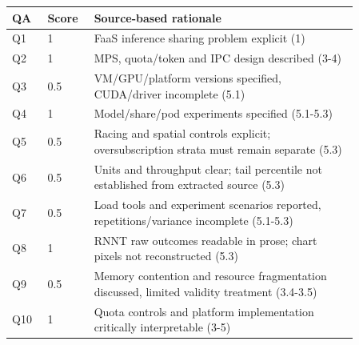 \begin{longtable}{P{0.09\linewidth}P{0.10\linewidth}P{0.67\linewidth}}
\toprule QA & Score & Source-based rationale\\\midrule\endhead
Q1 & 1 & FaaS inference sharing problem explicit (1)\\
Q2 & 1 & MPS, quota/token and IPC design described (3-4)\\
Q3 & 0.5 & VM/GPU/platform versions specified, CUDA/driver incomplete (5.1)\\
Q4 & 1 & Model/share/pod experiments specified (5.1-5.3)\\
Q5 & 0.5 & Racing and spatial controls explicit; oversubscription strata must remain separate (5.3)\\
Q6 & 0.5 & Units and throughput clear; tail percentile not established from extracted source (5.3)\\
Q7 & 0.5 & Load tools and experiment scenarios reported, repetitions/variance incomplete (5.1-5.3)\\
Q8 & 1 & RNNT raw outcomes readable in prose; chart pixels not reconstructed (5.3)\\
Q9 & 0.5 & Memory contention and resource fragmentation discussed, limited validity treatment (3.4-3.5)\\
Q10 & 1 & Quota controls and platform implementation critically interpretable (3-5)\\
\bottomrule\end{longtable}

